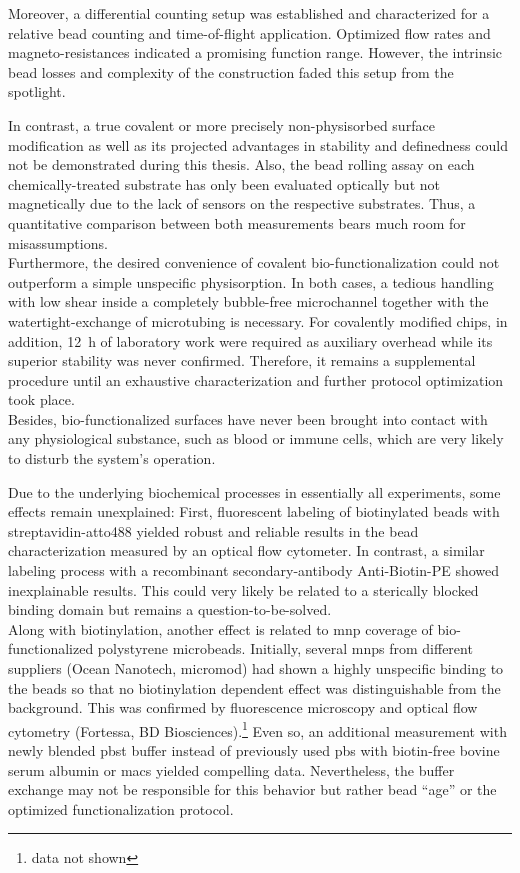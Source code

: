 Moreover, a differential counting setup was established and characterized for a relative bead counting and time-of-flight application. Optimized flow rates and magneto-resistances indicated a promising function range. However, the intrinsic bead losses and complexity of the construction faded this setup from the spotlight. 

In contrast, a true covalent or more precisely non-physisorbed surface modification as well as its projected advantages in stability and definedness could not be demonstrated during this thesis. Also, the bead rolling assay on each chemically-treated substrate has only been evaluated optically but not magnetically due to the lack of sensors on the respective substrates. Thus, a quantitative comparison between both measurements bears much room for misassumptions.\\
Furthermore, the desired convenience of covalent bio-functionalization could not outperform a simple unspecific physisorption. In both cases, a tedious handling with low shear inside a completely bubble-free microchannel together with the watertight-exchange of microtubing is necessary. For covalently modified chips, in addition, \SI{12}{\hour} of laboratory work were required as auxiliary overhead while its superior stability was never confirmed. Therefore, it remains a supplemental procedure until an exhaustive characterization and further protocol optimization took place.\\
Besides, bio-functionalized surfaces have never been brought into contact with any physiological substance, such as blood or immune cells, which are very likely to disturb the system's operation.

Due to the underlying biochemical processes in essentially all experiments, some effects remain unexplained: First, fluorescent labeling of biotinylated beads with strept\-avidin-atto488 yielded robust and reliable results in the bead characterization measured by an optical flow cytometer. In contrast, a similar labeling process with a recombinant secondary-antibody Anti-Biotin-PE showed inexplainable results. This could very likely be related to a sterically blocked binding domain but remains a question-to-be-solved.\\
Along with biotinylation, another effect is related to \gls{mnp} coverage of bio-functionalized polystyrene microbeads. Initially, several \glspl{mnp} from different suppliers (Ocean Nanotech, micromod) had shown a highly unspecific binding to the beads so that no biotinylation dependent effect was distinguishable from the background. This was confirmed by fluorescence microscopy and optical flow cytometry (Fortessa, BD Biosciences).\footnote{data not shown} Even so, an additional measurement with newly blended \gls{pbst} buffer instead of previously used \gls{pbs} with biotin-free bovine serum albumin or \gls{macs} yielded compelling data. Nevertheless, the buffer exchange may not be responsible for this behavior but rather bead ``age'' or the optimized functionalization protocol.

